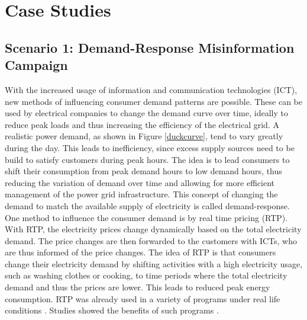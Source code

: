 \chapter{Case Studies}

\section{Scenario 1: Demand-Response Misinformation Campaign}
\label{demandresponsesection}

With the increased usage of information and communication 
technologies (ICT), new methods of influencing
consumer demand patterns are possible. 
These can be used by electrical companies to change the 
demand curve over time, ideally to reduce peak loads 
and thus increasing the efficiency of the electrical grid.
A realistic power demand, as shown in Figure \ref{duckcurve}, tend 
to vary greatly during the day. This leads to inefficiency,
since excess supply sources need to be build to satisfy customers
during peak hours. The idea is to lead consumers to shift
their consumption from peak demand hours to low demand hours,
thus reducing the variation of demand over time and allowing
for more efficient management of the power grid infrastructure.
This concept of changing the demand to match the 
available supply of electricity is called demand-response. 
One method to influence the consumer demand is by real time 
pricing (RTP). With RTP, the electricity prices change
dynamically based on the total electricity demand.
The price changes are then forwarded to the customers with ICTs, 
who are thus informed of the price changes.
The idea of RTP is that consumers change their electricity demand
by shifting activities with a high electricity usage, 
such as washing clothes or cooking, to time periods 
where the total electricity demand and thus the prices
are lower. This leads to reduced peak energy consumption. 
RTP was already used in a variety of programs
under real life conditions \cite{barbose2004survey}.
Studies showed the benefits of such programs \cite{albadi2008summary}.

